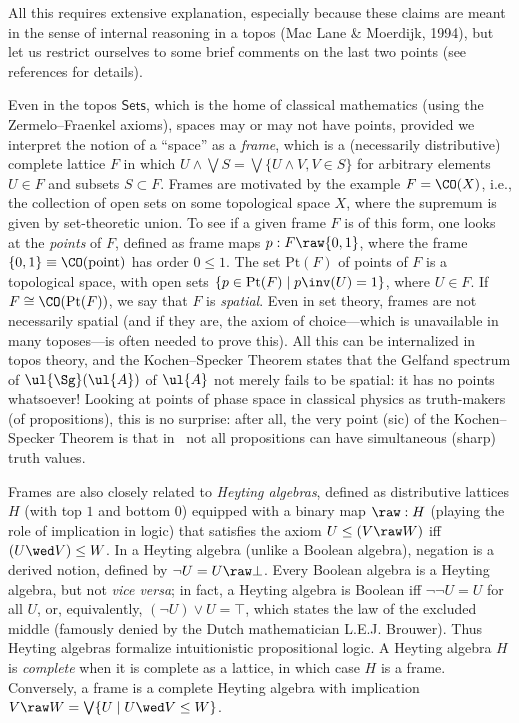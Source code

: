 \documentclass[12pt]{article}
\begin{document}
All this requires extensive explanation, especially because these claims are meant in the sense of internal reasoning in a topos (Mac Lane \& Moerdijk, 1994), but let us restrict ourselves to some brief comments on the last two points (see references for details).

 Even in the topos $\mathsf{Sets}$, which is the home of classical mathematics (using the Zermelo--Fraenkel axioms), spaces may or may not have points, provided we interpret the notion of a ``space'' as a \emph{frame}, which is a (necessarily distributive)
complete  lattice $F$ in which $U\wedge \bigvee S=\bigvee \{U\wedge V, V\in S\}$
 for arbitrary elements $U\in F$ and subsets $S\subset F$. Frames are motivated by the example $F=\CO(X)$,
 i.e., the collection of open sets on some topological space $X$, where the supremum is  given by  set-theoretic union.
 To see if a given frame $F$ is of this form, one looks at the \emph{points} of $F$, defined as frame maps $p:F\raw\{0,1\}$, where
 the frame $\{0,1\}\equiv \CO(\mathrm{point})$ has order $0\leq 1$. The set $\mathrm{Pt}(F)$ of points of $F$ is a topological space, with open sets $\{p\in \mathrm{Pt}(F)\mid p\inv(U)=1\}$, where $U\in F$. If $F\cong \CO(\mathrm{Pt}(F))$, we say that $F$ is \emph{spatial}.  Even in set theory, frames are not necessarily spatial (and if they are, the axiom of choice---which is unavailable in many toposes---is often needed to prove this).
 All this can be internalized in topos theory, and the Kochen--Specker Theorem states that the Gelfand spectrum of $\ul{\Sg}(\ul{A})$ of $\ul{A}$ not merely fails to be spatial: it has no points whatsoever! Looking at points of phase space in classical physics as truth-makers (of propositions), this is no surprise: after all,  the very point (sic) of the Kochen--Specker Theorem is  that in \qm\ not all propositions can have simultaneous (sharp) truth values. 
 
 Frames are also closely related to \emph{Heyting algebras}, defined as distributive lattices ${H}$ (with top $1$ and bottom $0$) equipped with a binary map $\raw:{H}\x{H}\raw{H}$ (playing the role of implication in logic) that satisfies the axiom 
$U\leq (V\raw W)$   iff  $(U\wed V)\leq W$. In a Heyting algebra (unlike a Boolean algebra), negation is a derived
notion, defined by $\neg U=U\raw\bot$. 
 Every Boolean algebra is
a Heyting algebra, but not \emph{vice versa}; in fact, a Heyting
algebra is Boolean iff $\neg\neg U=U$ for all $U$, or, equivalently,  $(\neg U)\vee U=\top$,
which states the law of the excluded middle (famously denied by the Dutch mathematician L.E.J. Brouwer). 
Thus Heyting algebras formalize intuitionistic propositional logic. 
A  Heyting algebra  $H$ is \emph{complete} when it is complete as a lattice, in which case $H$ is a frame.
 Conversely,  a frame is a complete Heyting algebra with implication $V\raw W=\bigvee\{U\mid U\wed V\leq W\}$. 
 
\end{document}
